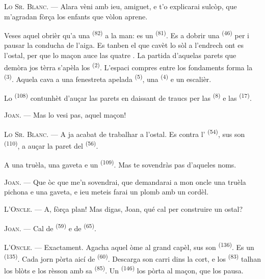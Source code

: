 \VUsaut{3.0mm}

\textsc{Lo Sr. Blanc}. --- Alara vèni amb ieu, amiguet, e t'o explicarai
sulcòp, que m'agradan fòrça los enfants que vòlon aprene.

Veses aquel obrièr qu'a una  \textsuperscript{(82)} a la man: es un
 \textsuperscript{(81)}. Es a dobrir una 
\textsuperscript{(46)} per i pausar la conducha de l'aiga. Es tanben el que cavèt
lo sòl a l'endrech ont es l'ostal, per que lo maçon auce las quatre
. La partida d'aquelas parets que demòra jos tèrra s'apèla los
 \textsuperscript{(2)}. L'espaci compres entre los fondaments
forma la  \textsuperscript{(3)}. Aquela cava a una fenestreta apelada
 \textsuperscript{(5)}, una 
\textsuperscript{(4)} e un escalièr.

Lo  \textsuperscript{(108)} contunhèt d'auçar las parets en daissant
de traucs per las  \textsuperscript{(8)} e las 
\textsuperscript{(17)}.

\textsc{Joan}. --- Mas lo vesi pas, aquel maçon!

\textsc{Lo Sr. Blanc}. --- A ja acabat de trabalhar a l'ostal. Es contra
l' \textsuperscript{(54)}, sus son 
\textsuperscript{(110)}, a auçar la paret del 
\textsuperscript{(56)}.

A una truèla, una gaveta e un  \textsuperscript{(109)}. Mas te
sovendràs pas d'aqueles noms.

\textsc{Joan}. --- Que òc que me'n sovendrai, que demandarai a mon oncle una
truèla pichona e una gaveta, e ieu meteis farai un plomb amb un cordèl.

\VUsaut{3.0mm}
\VUsaut{3.0mm}

\textsc{L'Oncle}. --- A, fòrça plan! Mas digas, Joan, qué cal per construire un
ostal?

\textsc{Joan}. --- Cal de  \textsuperscript{(59)} e de
 \textsuperscript{(65)}.

\textsc{L'Oncle}. --- Exactament. Agacha aquel òme al grand capèl, sus son
 \textsuperscript{(136)}. Es un 
\textsuperscript{(135)}. Cada jorn pòrta aicí de 
\textsuperscript{(60)}. Descarga son carri dins la cort, e los
 \textsuperscript{(83)} talhan los blòts e los rèsson amb sa
 \textsuperscript{(85)}. Un 
\textsuperscript{(146)} los pòrta al maçon, que los pausa.

